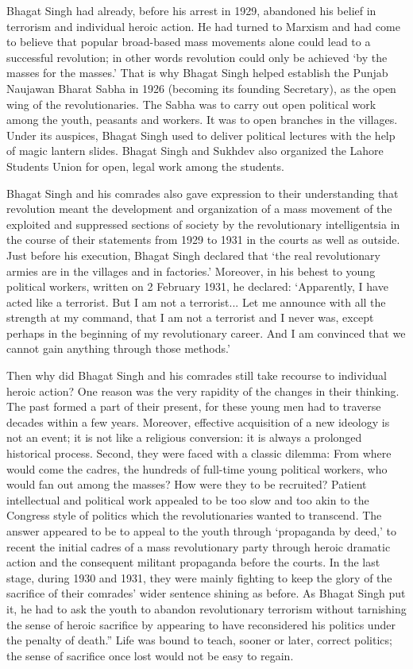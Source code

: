 Bhagat Singh had already, before his arrest in 1929, abandoned his belief in terrorism and individual heroic action. He had turned to Marxism and had come to believe that popular broad-based mass movements alone could lead to a successful revolution; in other words revolution could only be achieved `by the masses for the masses.' That is why Bhagat Singh helped establish the Punjab Naujawan Bharat Sabha in 1926 (becoming its founding Secretary), as the open wing of the revolutionaries. The Sabha was to carry out open political work among the youth, peasants and workers. It was to open branches in the villages. Under its auspices, Bhagat Singh used to deliver political lectures with the help of magic lantern slides. Bhagat Singh and Sukhdev also organized the Lahore Students Union for open, legal work among the students.

Bhagat Singh and his comrades also gave expression to their understanding that revolution meant the development and organization of a mass movement of the exploited and suppressed sections of society by the revolutionary intelligentsia in the course of their statements from 1929 to 1931 in the courts as well as outside. Just before his execution, Bhagat Singh declared that `the real revolutionary armies are in the villages and in factories.' Moreover, in his behest to young political workers, written on 2 February 1931, he declared: `Apparently, I have acted like a terrorist. But I am not a terrorist... Let me announce with all the strength at my command, that I am not a terrorist and I never was, except perhaps in the beginning of my revolutionary career. And I am convinced that we cannot gain anything through those methods.'

Then why did Bhagat Singh and his comrades still take recourse to individual heroic action? One reason was the very rapidity of the changes in their thinking. The past formed a part of their present, for these young men had to traverse decades within a few years. Moreover, effective acquisition of a new ideology is not an event; it is not like a religious conversion: it is always a prolonged historical process. Second, they were faced with a classic dilemma: From where would come the cadres, the hundreds of full-time young political workers, who would fan out among the masses? How were they to be recruited? Patient intellectual and political work appealed to be too slow and too akin to the Congress style of politics which the revolutionaries wanted to transcend. The answer appeared to be to appeal to the youth through `propaganda by deed,' to recent the initial cadres of a mass revolutionary party through heroic dramatic action and the consequent militant propaganda before the courts. In the last stage, during 1930 and 1931, they were mainly fighting to keep the glory of the sacrifice of their comrades' wider sentence shining as before. As Bhagat Singh put it, he had to ask the youth to abandon revolutionary terrorism without tarnishing the sense of heroic sacrifice by appearing to have reconsidered his politics under the penalty of death.'' Life was bound to teach, sooner or later, correct politics; the sense of sacrifice once lost would not be easy to regain.

